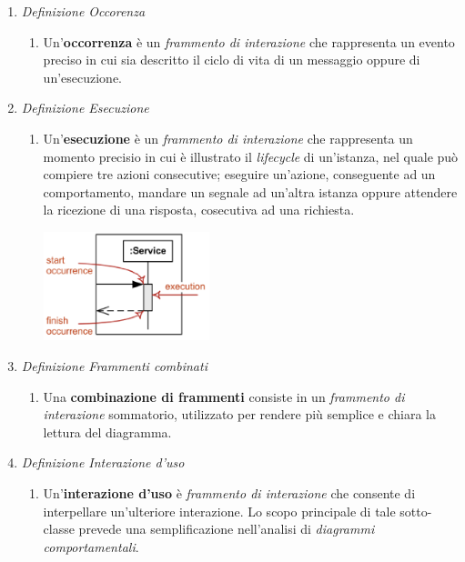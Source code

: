 \documentclass{article}
\begin{document}
\begin{enumerate}
    \renewcommand{\labelenumi}{-}
    \itemsep0em
    \item \textit{Definizione Occorenza} \begin{enumerate}[label={ }]
                        \item Un'\textbf{occorrenza} è un \textit{frammento di interazione} che rappresenta un evento preciso in cui sia descritto il ciclo di vita di un messaggio oppure di un'esecuzione.
                    \end{enumerate}
    \item \textit{Definizione Esecuzione} \begin{enumerate}[label={ }]
                        \item Un'\textbf{esecuzione} è un \textit{frammento di interazione} che rappresenta un momento precisio in cui è illustrato il \textit{lifecycle} di un'istanza, nel quale può compiere tre azioni consecutive; eseguire un'azione, conseguente ad un comportamento, mandare un segnale ad un'altra istanza oppure attendere la ricezione di una risposta, cosecutiva ad una richiesta.
                        \begin{center}
                            \includegraphics[width=0.4\textwidth]{foto 10.png}\\
                        \end{center}
                     \end{enumerate}
    \item \textit{Definizione Frammenti combinati} \begin{enumerate}[label={ }]
                                \item Una \textbf{combinazione di frammenti} consiste in un \textit{frammento di interazione} sommatorio, utilizzato per rendere più semplice e chiara la lettura del diagramma. 
                              \end{enumerate}
    \item \textit{Definizione Interazione d'uso} \begin{enumerate}[label={ }]
                                \item Un'\textbf{interazione d'uso} è \textit{frammento di interazione} che consente di interpellare un'ulteriore interazione. Lo scopo principale di tale sotto-classe prevede una semplificazione nell'analisi di \textit{diagrammi comportamentali}.\vspace*{14pt}

\end{enumerate}
\end{enumerate}
\end{document}
